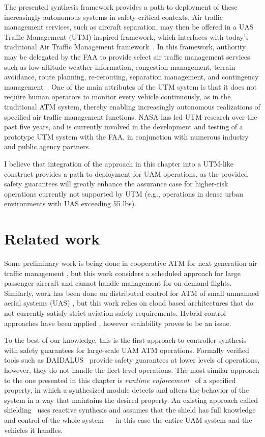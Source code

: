 The presented synthesis framework provides a path to deployment of these increasingly autonomous systems in safety-critical contexts.  Air traffic management services, such as aircraft separation, may then be offered in a UAS Traffic Management (UTM) inspired framework, which interfaces with today’s traditional Air Traffic Management framework~\cite{PRKRJJ2016}. In this framework,  authority may be delegated by the FAA to provide select air traffic management services such as low-altitude weather information, congestion management, terrain avoidance, route planning, re-rerouting, separation management, and contingency management~\cite{MBYDLGMC2018,NCDDASC2018}.  One of the main attributes of the UTM system is that it does not require human operators to monitor every vehicle continuously, as in the traditional ATM system, thereby enabling increasingly autonomous realizations of specified air traffic management functions.  NASA has led UTM research over the past five years, and is currently involved in the development and testing of a prototype UTM system with the FAA, in conjunction with numerous industry and public agency partners.  

I believe that integration of the approach in this chapter into a UTM-like construct provides a path to deployment for UAM operations, as the provided safety guarantees will greatly enhance the assurance case for higher-risk operations currently not supported by UTM (e.g., operations in dense urban environments with UAS exceeding 55 lbs).


\section{Related work}

 Some preliminary work is being done in cooperative ATM for next generation air traffic management \cite{prevot2005co}, but this work considers a scheduled approach for large passenger aircraft and cannot handle management for on-demand flights. Similarly, work has been done on distributed control for ATM of small unmanned aerial systems (UAS) \cite{FSLLK2015}, but this work relies on cloud based architectures that do not currently satisfy strict aviation safety requirements.  Hybrid control approaches have been applied \cite{tomlin1996hybrid}, however scalability proves to be an issue.


To the best of our knowledge, this is the first approach to
controller synthesis with safety guarantees for large-scale UAM ATM operations. Formally verified tools such as DAIDALUS~\cite{Daidalus} provide safety guarantees at lower levels of operations, however, they do not handle the fleet-level operations. The most similar approach to the one presented in this chapter is \emph{runtime enforcement}~\cite{Falcone10,Schneider00} of a specified property, in which a synthesized module detects and alters the behavior of the system in a way that maintains the desired property. An existing approach called shielding~\cite{BloemKKW15,KonighoferABHKT17} uses reactive synthesis and assumes that the shield has full knowledge and control of the whole system --- in this case the entire UAM system and the vehicles it handles. 

